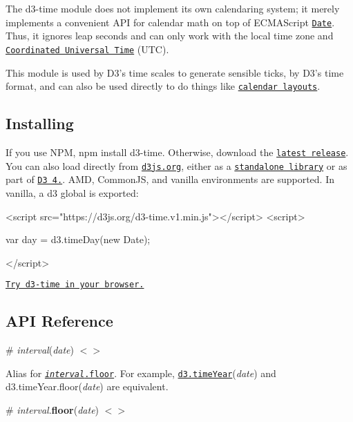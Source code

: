 The d3-\/time module does not implement its own calendaring system; it merely implements a convenient A\+PI for calendar math on top of E\+C\+M\+A\+Script \href{https://developer.mozilla.org/en-US/docs/Web/JavaScript/Reference/Global_Objects/Date}{\tt Date}. Thus, it ignores leap seconds and can only work with the local time zone and \href{https://en.wikipedia.org/wiki/Coordinated_Universal_Time}{\tt Coordinated Universal Time} (U\+TC).

This module is used by D3’s time scales to generate sensible ticks, by D3’s time format, and can also be used directly to do things like \href{http://bl.ocks.org/mbostock/4063318}{\tt calendar layouts}.

\subsection*{Installing}

If you use N\+PM, {\ttfamily npm install d3-\/time}. Otherwise, download the \href{https://github.com/d3/d3-time/releases/latest}{\tt latest release}. You can also load directly from \href{https://d3js.org}{\tt d3js.\+org}, either as a \href{https://d3js.org/d3-time.v1.min.js}{\tt standalone library} or as part of \href{https://github.com/d3/d3}{\tt D3 4.}. A\+MD, Common\+JS, and vanilla environments are supported. In vanilla, a {\ttfamily d3} global is exported\+:


\begin{DoxyCode}
<script src="https://d3js.org/d3-time.v1.min.js"></script>
<script>

var day = d3.timeDay(new Date);

</script>
\end{DoxyCode}


\href{https://tonicdev.com/npm/d3-time}{\tt Try d3-\/time in your browser.}

\subsection*{A\+PI Reference}

\label{__interval}%
\# {\itshape interval}({\itshape date}) \href{https://github.com/d3/d3-time/blob/master/src/interval.js#L6}{\tt $<$$>$}

Alias for \href{#interval_floor}{\tt {\itshape interval}.floor}. For example, \href{#timeYear}{\tt d3.\+time\+Year}({\itshape date}) and d3.\+time\+Year.\+floor({\itshape date}) are equivalent.

\label{_interval_floor}%
\# {\itshape interval}.{\bfseries floor}({\itshape date}) \href{https://github.com/d3/d3-time/blob/master/src/interval.js#L10}{\tt $<$$>$}

